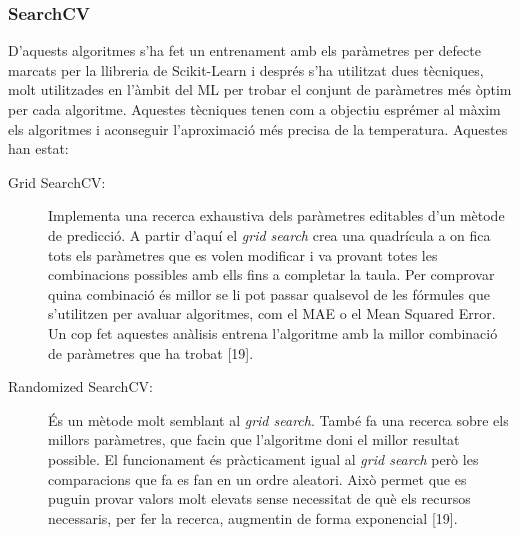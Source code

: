 \documentclass[10pt,a4paper,twocolumn,twoside]{article}
\begin{document}
\subsubsection{SearchCV}
D'aquests algoritmes s'ha fet un entrenament amb els paràmetres per defecte marcats per la llibreria de Scikit-Learn i després s'ha utilitzat dues tècniques, molt utilitzades en l'àmbit del ML per trobar el conjunt de paràmetres més òptim per cada algoritme. Aquestes tècniques tenen com a objectiu esprémer al màxim els algoritmes i aconseguir l'aproximació més precisa de la temperatura. Aquestes han estat:
\begin{description}
\item[Grid SearchCV:] Implementa una recerca exhaustiva dels paràmetres editables d'un mètode de predicció. A partir d'aquí el \textit{grid search} crea una quadrícula a on fica tots els paràmetres que es volen modificar i va provant totes les combinacions possibles amb ells fins a completar la taula. Per comprovar quina combinació és millor se li pot passar qualsevol de les fórmules que s'utilitzen per avaluar algoritmes, com el MAE o el Mean Squared Error. Un cop fet aquestes anàlisis entrena l'algoritme amb la millor combinació de paràmetres que ha trobat [19].

\item[Randomized SearchCV:] És un mètode molt semblant al \textit{grid search}. També fa una recerca sobre els millors paràmetres, que facin que l'algoritme doni el millor resultat possible. El funcionament és pràcticament igual al \textit{grid search} però les comparacions que fa es fan en un ordre aleatori. Això permet que es puguin provar valors molt elevats sense necessitat de què els recursos necessaris, per fer la recerca, augmentin de forma exponencial [19].


\end{description}
\end{document}
